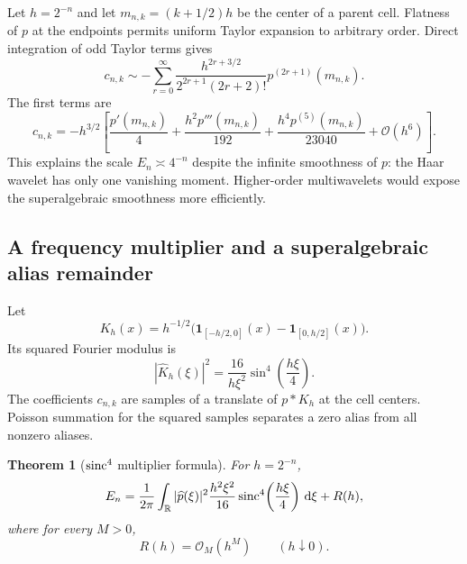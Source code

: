 \documentclass[11pt]{article}
\newtheorem{theorem}{Theorem}[section]
\theoremstyle{definition}
\theoremstyle{remark}
\newcommand{\R}{\mathbb R}
\newcommand{\dd}{\,\mathrm d}
\newcommand{\bigO}{\mathcal O}
\newcommand{\one}{\mathbf 1}
\begin{document}
Let $h=2^{-n}$ and let $m_{n,k}=(k+1/2)h$ be the center of a parent cell.
Flatness of $p$ at the endpoints permits uniform Taylor expansion to arbitrary
order.  Direct integration of odd Taylor terms gives
\begin{equation}\label{p3:eq:c-local-asymptotic}
 c_{n,k}\sim-
 \sum_{r=0}^\infty
 \frac{h^{2r+3/2}}{2^{2r+1}(2r+2)!}
 p^{(2r+1)}(m_{n,k}).
\end{equation}
The first terms are
\begin{equation}\label{p3:eq:c-local-first}
 c_{n,k}=-h^{3/2}\left[
 \frac{p'(m_{n,k})}{4}
 +\frac{h^2p'''(m_{n,k})}{192}
 +\frac{h^4p^{(5)}(m_{n,k})}{23040}
 +\bigO(h^6)
 \right].
\end{equation}
This explains the scale $E_n\asymp4^{-n}$ despite the infinite smoothness of
$p$: the Haar wavelet has only one vanishing moment.  Higher-order multiwavelets
would expose the superalgebraic smoothness more efficiently.

\subsection{A frequency multiplier and a superalgebraic alias remainder}

Let
\begin{equation}\label{p3:eq:Kh-def}
 K_h(x)=h^{-1/2}
 \bigl(\one_{[-h/2,0]}(x)-\one_{[0,h/2]}(x)\bigr).
\end{equation}
Its squared Fourier modulus is
\begin{equation}\label{p3:eq:Kh-transform}
 |\widehat K_h(\xi)|^2
 =\frac{16}{h\xi^2}\sin^4\!\left(\frac{h\xi}{4}\right).
\end{equation}
The coefficients $c_{n,k}$ are samples of a translate of $p*K_h$ at the cell
centers.  Poisson summation for the squared samples separates a zero alias from
all nonzero aliases.

\begin{theorem}[$\operatorname{sinc}^4$ multiplier formula]
\label{p3:thm:sinc4-energy}
For $h=2^{-n}$,
\begin{equation}\label{p3:eq:En-multiplier}
 E_n=\frac1{2\pi}\int_\R|\widehat p(\xi)|^2
 \frac{h^2\xi^2}{16}\sinc^4\!\left(\frac{h\xi}{4}\right)\dd\xi
 +R(h),
\end{equation}
where for every $M>0$,
\begin{equation}\label{p3:eq:alias-superalgebraic}
 R(h)=\bigO_M(h^M)\qquad(h\downarrow0).
\end{equation}
\end{theorem}
\end{document}
